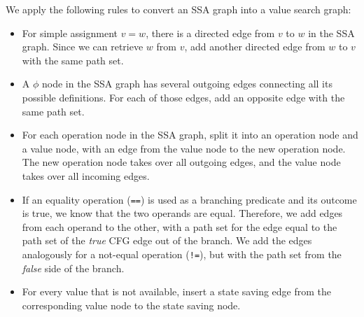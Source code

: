 We apply the following rules to convert an SSA graph into a value search graph:
\begin{itemize}
	\item For simple assignment $v = w$, there is a directed edge from $v$ to $w$ in the SSA graph. 
	Since we can retrieve $w$ from $v$, add another directed edge from $w$ to $v$ with the same path set.

	\item A $\phi$ node in the SSA graph has several outgoing edges connecting all its possible definitions. 
	For each of those edges, add an opposite edge with the same path set. 
	
	\item For each operation node in the SSA graph, split it into an operation node and a value node, with an edge from the value node to the new operation node. 
	The new operation node takes over all outgoing edges, and the value node takes over all incoming edges. 
	
	\item If an equality operation (\texttt{==}) is used as a branching predicate and its outcome is true, we know that the two operands are equal.
	Therefore, we add edges from each operand to the other, with a path set for the edge equal to the path set of the \emph{true} CFG edge out of the branch. 
	We add the edges analogously for a not-equal operation (\texttt{!=}), but with the path set from the \emph{false} side of the branch.
	
	\item For every value that is not available, insert a state saving edge from the corresponding value node to the state saving node. 
\end{itemize}


